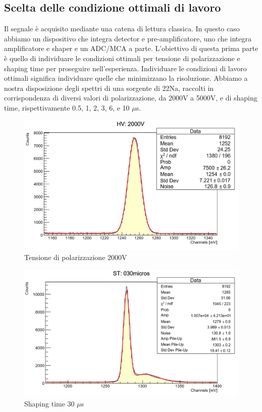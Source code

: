 \documentclass[a4paper,10pt]{article}
\begin{document}

\subsection{Scelta delle condizione ottimali di lavoro}
Il segnale \`e acquisito mediante una catena di lettura classica. In questo caso abbiamo un dispositivo che integra detector e pre-amplificatore, uno che integra amplificatore e shaper e un ADC/MCA a parte. L'obiettivo di questa prima parte \`e quello di individuare le condizioni ottimali per tensione di polarizzazione e shaping time per proseguire nell'esperienza. Individuare le condizioni di lavoro ottimali significa individuare quelle che minimizzano la risoluzione. Abbiamo a nostra disposizione degli spettri di una sorgente di 22Na, raccolti in corrispondenza di diversi valori di polarizzazione, da 2000V a 5000V, e di shaping time, rispettivamente 0.5, 1, 2, 3, 6, e 10 $\mu$s. 

\begin{figure}[h!]
    \centering
    \includegraphics[scale=0.45]{grafici/hv}
    \caption{Tensione di polarizzazione 2000V}
\end{figure}

\begin{figure}[h!]
    \centering
    \includegraphics[scale=0.45]{grafici/st}
    \caption{Shaping time 30 $\mu$s}
\end{figure}
\end{document}

